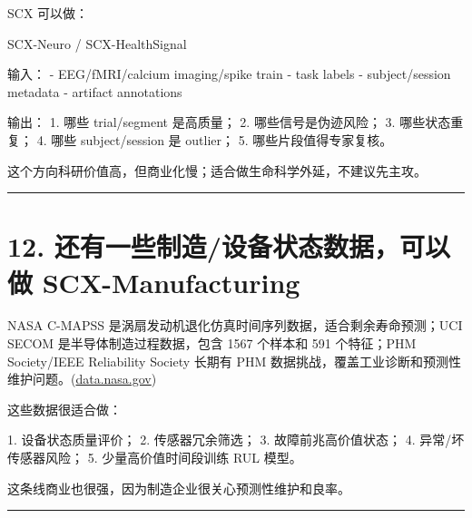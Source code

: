 \documentclass[
  12pt,
]{ctexart}
\newenvironment{Shaded}{}{}
\newcommand{\NormalTok}[1]{#1}
\begin{document}
SCX 可以做：

\begin{Shaded}
\begin{Highlighting}[]
\NormalTok{SCX{-}Neuro / SCX{-}HealthSignal}

\NormalTok{输入：}
\NormalTok{{-} EEG/fMRI/calcium imaging/spike train}
\NormalTok{{-} task labels}
\NormalTok{{-} subject/session metadata}
\NormalTok{{-} artifact annotations}

\NormalTok{输出：}
\NormalTok{1. 哪些 trial/segment 是高质量；}
\NormalTok{2. 哪些信号是伪迹风险；}
\NormalTok{3. 哪些状态重复；}
\NormalTok{4. 哪些 subject/session 是 outlier；}
\NormalTok{5. 哪些片段值得专家复核。}
\end{Highlighting}
\end{Shaded}

这个方向科研价值高，但商业化慢；适合做生命科学外延，不建议先主攻。

\begin{center}\rule{0.5\linewidth}{0.5pt}\end{center}

\section{12. 还有一些制造/设备状态数据，可以做
SCX-Manufacturing}\label{ux8fd8ux6709ux4e00ux4e9bux5236ux9020ux8bbeux5907ux72b6ux6001ux6570ux636eux53efux4ee5ux505a-scx-manufacturing}

NASA C-MAPSS 是涡扇发动机退化仿真时间序列数据，适合剩余寿命预测；UCI
SECOM 是半导体制造过程数据，包含 1567 个样本和 591 个特征；PHM
Society/IEEE Reliability Society 长期有 PHM
数据挑战，覆盖工业诊断和预测性维护问题。(\href{https://data.nasa.gov/dataset/cmapss-jet-engine-simulated-data?utm_source=chatgpt.com}{data.nasa.gov})

这些数据很适合做：

\begin{Shaded}
\begin{Highlighting}[]
\NormalTok{1. 设备状态质量评价；}
\NormalTok{2. 传感器冗余筛选；}
\NormalTok{3. 故障前兆高价值状态；}
\NormalTok{4. 异常/坏传感器风险；}
\NormalTok{5. 少量高价值时间段训练 RUL 模型。}
\end{Highlighting}
\end{Shaded}

这条线商业也很强，因为制造企业很关心预测性维护和良率。

\begin{center}\rule{0.5\linewidth}{0.5pt}\end{center}
\end{document}
